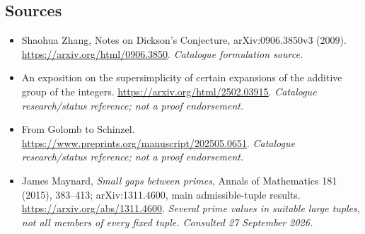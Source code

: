 \documentclass[11pt,a4paper]{article}
\numberwithin{equation}{section}
\begin{document}
\subsection{Sources}
\begin{itemize}\raggedright
\item[\textnormal{[S1]}]\hypertarget{source:62:1}{} Shaohua Zhang, Notes on Dickson's Conjecture, arXiv:0906.3850v3 (2009).
\url{https://arxiv.org/html/0906.3850}.
{\small\textit{Catalogue formulation source.}}
\item[\textnormal{[S2]}]\hypertarget{source:62:2}{} An exposition on the supersimplicity of certain expansions of the additive group of the integers.
\url{https://arxiv.org/html/2502.03915}.
{\small\textit{Catalogue research/status reference; not a proof endorsement.}}
\item[\textnormal{[S3]}]\hypertarget{source:62:3}{} From Golomb to Schinzel.
\url{https://www.preprints.org/manuscript/202505.0651}.
{\small\textit{Catalogue research/status reference; not a proof endorsement.}}

\item[\textnormal{[E1]}]\hypertarget{extra:62:1}{} James Maynard, \emph{Small gaps between primes}, Annals of Mathematics 181 (2015), 383--413; arXiv:1311.4600, main admissible-tuple results.
\url{https://arxiv.org/abs/1311.4600}.
{\small\textit{Several prime values in suitable large tuples, not all members of every fixed tuple. Consulted 27 September 2026.}}
\end{itemize}
\end{document}
